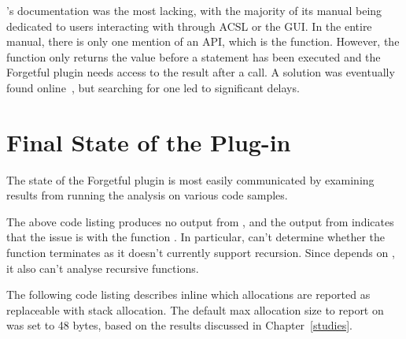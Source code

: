 's documentation was the most lacking, with the majority of its manual being dedicated to users interacting with  through ACSL or the  GUI\@. In the entire manual, there is only one mention of an  API, which is the  function. However, the  function only returns the value before a statement has been executed and the Forgetful plugin needs access to the result after a \malloc{} call. A solution was eventually found online~\cite{foldstate}, but searching for one led to significant delays.

\section{Final State of the Plug-in}

The state of the Forgetful plugin is most easily communicated by examining results from running the analysis on various code samples.



The above code listing produces no output from , and the output from  indicates that the issue is with the function . In particular,  can't determine whether the function terminates as it doesn't currently support recursion. Since  depends on , it also can't analyse recursive functions.

The following code listing describes inline which allocations are reported as replaceable with stack allocation. The default max allocation size to report on was set to 48 bytes, based on the results discussed in Chapter~\ref{studies}.



